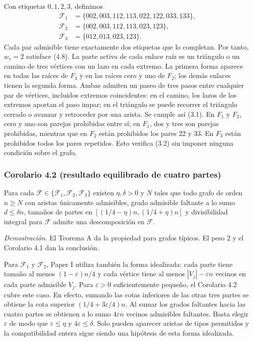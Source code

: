 \documentclass[spanish,11pt,a4paper]{article}
\begin{document}
Con etiquetas \(0,1,2,3\), definimos \[\begin{aligned}
\mathcal F_1&=\{002,003,112,113,022,122,033,133\},\\
\mathcal F_2&=\{002,003,112,113,023,123\},\\
\mathcal F_3&=\{012,013,023,123\}.
\end{aligned}
\tag{4.12}\] Cada par admisible tiene exactamente dos etiquetas que lo completan. Por tanto, \(w_\tau=2\) satisface (4.8). La parte activa de cada enlace raíz es un triángulo o un camino de tres vértices con un lazo en cada extremo. La primera forma aparece en todas las raíces de \(F_3\) y en las raíces cero y uno de \(F_2\); los demás enlaces tienen la segunda forma. Ambas admiten un paseo de tres pasos entre cualquier par de vértices, incluidos extremos coincidentes: en el camino, los lazos de los extremos aportan el paso impar; en el triángulo se puede recorrer el triángulo cerrado o avanzar y retroceder por una arista. Se cumple así (3.1). En \(F_1\) y \(F_2\), cero y uno son parejas prohibidas entre sí; en \(F_1\), dos y tres son parejas prohibidas, mientras que en \(F_2\) están prohibidos los pares \(22\) y \(33\). En \(F_3\) están prohibidos todos los pares repetidos. Esto verifica (3.2) sin imponer ninguna condición sobre el grafo.

\subsubsection{Corolario 4.2 (resultado equilibrado de cuatro partes)}\label{corolario-4.2-resultado-equilibrado-de-cuatro-partes}

Para cada \(\mathcal F\in\{\mathcal F_1,\mathcal F_2,\mathcal F_3\}\) existen \(\eta,\delta>0\) y \(N\) tales que todo grafo de orden \(n\ge N\) con aristas únicamente admisibles, grado admisible faltante a lo sumo \(d\le\delta n\), tamaños de partes en \([(1/4-\eta)n,(1/4+\eta)n]\) y divisibilidad integral para \(\mathcal F\) admite una descomposición en \(\mathcal F\).

\emph{Demostración.} El Teorema A da la propiedad para grafos típicos. El peso \(2\) y el Corolario 4.1 dan la conclusión.

Para \(\mathcal F_1\) y \(\mathcal F_2\), Paper I utiliza también la forma idealizada: cada parte tiene tamaño al menos \((1-\varepsilon)n/4\) y cada vértice tiene al menos \(|V_j|-\varepsilon n\) vecinos en cada parte admisible \(V_j\). Para \(\varepsilon>0\) suficientemente pequeño, el Corolario 4.2 cubre este caso. En efecto, sumando las cotas inferiores de las otras tres partes se obtiene la cota superior \((1/4+3\varepsilon/4)n\). Al sumar los grados faltantes hacia las cuatro partes se obtienen a lo sumo \(4\varepsilon n\) vecinos admisibles faltantes. Basta elegir \(\varepsilon\) de modo que \(\varepsilon\le\eta\) y \(4\varepsilon\le\delta\). Solo pueden aparecer aristas de tipos permitidos y la compatibilidad entera sigue siendo una hipótesis de esta forma idealizada.
\end{document}
